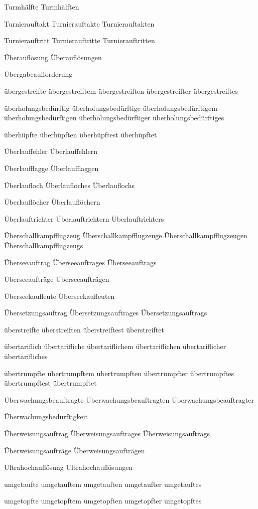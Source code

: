 Turmhälfte
Turmhälften

Turnierauftakt
Turnierauftakte
Turnierauftakten

Turnierauftritt
Turnierauftritte
Turnierauftritten

Überauflösung
Überauflösungen

Übergabeaufforderung

übergestreifte
übergestreiftem
übergestreiften
übergestreifter
übergestreiftes

überholungsbedürftig
überholungsbedürftige
überholungsbedürftigem
überholungsbedürftigen
überholungsbedürftiger
überholungsbedürftiges

überhüpfte
überhüpften
überhüpftest
überhüpftet

Überlauffehler
Überlauffehlern

Überlaufflagge
Überlaufflaggen

Überlaufloch
Überlaufloches
Überlauflochs

Überlauflöcher
Überlauflöchern

Überlauftrichter
Überlauftrichtern
Überlauftrichters

Überschallkampfflugzeug
Überschallkampfflugzeuge
Überschallkampfflugzeugen
Überschallkampfflugzeugs

Überseeauftrag
Überseeauftrages
Überseeauftrags

Überseeaufträge
Überseeaufträgen

Überseekaufleute
Überseekaufleuten

Übersetzungsauftrag
Übersetzungsauftrages
Übersetzungsauftrags

überstreifte
überstreiften
überstreiftest
überstreiftet

übertariflich
übertarifliche
übertariflichem
übertariflichen
übertariflicher
übertarifliches

übertrumpfte
übertrumpftem
übertrumpften
übertrumpfter
übertrumpftes
übertrumpftest
übertrumpftet

Überwachungsbeauftragte
Überwachungsbeauftragten
Überwachungsbeauftragter

Überwachungsbedürftigkeit

Überweisungsauftrag
Überweisungsauftrages
Überweisungsauftrags

Überweisungsaufträge
Überweisungsaufträgen

Ultrahochauflösung
Ultrahochauflösungen

umgetaufte
umgetauftem
umgetauften
umgetaufter
umgetauftes

umgetopfte
umgetopftem
umgetopften
umgetopfter
umgetopftes

